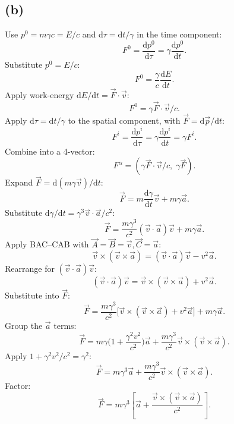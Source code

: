 \documentclass[11pt]{article}
\newcommand{\de}{\mathrm{d}}
\begin{document}
\subsection*{(b)}
Use $p^{0}=m\gamma c=E/c$ and $\de\tau=\de t/\gamma$ in the time component:
\[ F^{0}=\frac{\de p^{0}}{\de\tau}=\gamma\frac{\de p^{0}}{\de t}. \]
Substitute $p^{0}=E/c$:
\[ F^{0}=\frac{\gamma}{c}\frac{\de E}{\de t}. \]
Apply work-energy $\de E/\de t=\vec F\cdot\vec v$:
\[ F^{0}=\gamma\vec F\cdot\vec v/c. \]
Apply $\de\tau=\de t/\gamma$ to the spatial component, with $\vec F=\de\vec p/\de t$:
\[ F^{i}=\frac{\de p^{i}}{\de\tau}=\gamma\frac{\de p^{i}}{\de t}=\gamma F^{i}. \]
Combine into a 4-vector:
\[ \boxed{\;F^{\alpha}=(\gamma\vec F\cdot\vec v/c,\;\gamma\vec F).\;} \]
Expand $\vec F=\de(m\gamma\vec v)/\de t$:
\[ \vec F=m\frac{\de\gamma}{\de t}\vec v+m\gamma\vec a. \]
Substitute $\de\gamma/\de t=\gamma^{3}\vec v\cdot\vec a/c^{2}$:
\[ \vec F=\frac{m\gamma^{3}}{c^{2}}(\vec v\cdot\vec a)\vec v+m\gamma\vec a. \]
Apply BAC--CAB with $\vec A=\vec B=\vec v,\vec C=\vec a$:
\[ \vec v\times(\vec v\times\vec a)=(\vec v\cdot\vec a)\vec v-v^{2}\vec a. \]
Rearrange for $(\vec v\cdot\vec a)\vec v$:
\[ (\vec v\cdot\vec a)\vec v=\vec v\times(\vec v\times\vec a)+v^{2}\vec a. \]
Substitute into $\vec F$:
\[ \vec F=\frac{m\gamma^{3}}{c^{2}}\big[\vec v\times(\vec v\times\vec a)+v^{2}\vec a\big]+m\gamma\vec a. \]
Group the $\vec a$ terms:
\[ \vec F=m\gamma\!\Big(1+\frac{\gamma^{2}v^{2}}{c^{2}}\Big)\vec a+\frac{m\gamma^{3}}{c^{2}}\vec v\times(\vec v\times\vec a). \]
Apply $1+\gamma^{2}v^{2}/c^{2}=\gamma^{2}$:
\[ \vec F=m\gamma^{3}\vec a+\frac{m\gamma^{3}}{c^{2}}\vec v\times(\vec v\times\vec a). \]
Factor:
\[ \boxed{\;\vec F=m\gamma^{3}\!\left[\vec a+\frac{\vec v\times(\vec v\times\vec a)}{c^{2}}\right].\;} \]
\end{document}

